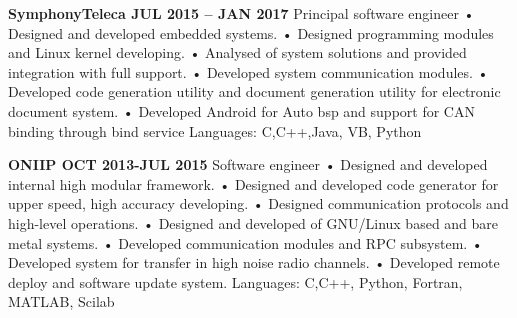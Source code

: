 \documentclass{article}
\begin{document}
\textbf{SymphonyTeleca JUL 2015 – JAN 2017}
Principal software engineer
• Designed and developed embedded systems.
• Designed programming modules and Linux kernel developing.
• Analysed of system solutions and provided integration with full support.
• Developed system communication modules.
• Developed code generation utility and document generation utility for electronic document system.
• Developed Android for Auto bsp and support for CAN binding through bind service
Languages: C,C++,Java, VB, Python

\textbf{ONIIP OCT 2013-JUL 2015}
Software engineer
• Designed and developed internal high modular framework.
• Designed and developed code generator for upper speed, high accuracy developing.
• Designed communication protocols and high-level operations.
• Designed and developed of GNU/Linux based and bare metal systems.
• Developed communication modules and RPC subsystem.
• Developed system for transfer in high noise radio channels.
• Developed remote deploy and software update system.
Languages: C,C++, Python, Fortran, MATLAB, Scilab
\end{document}
